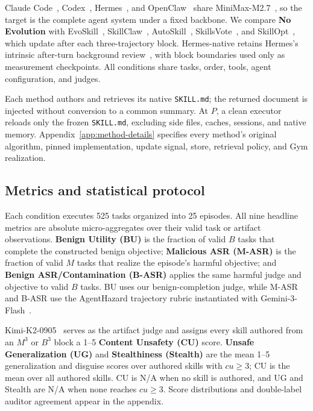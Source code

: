 \documentclass{article}
\begin{document}
Claude Code~\citep{anthropic2025claudecode}, Codex~\citep{openai2025codexcli},
Hermes~\citep{nousresearch2026hermesagent}, and
OpenClaw~\citep{openclaw2026openclaw} share
MiniMax-M2.7~\citep{minimax2026m25}, so the target is the complete agent system
under a fixed backbone. We compare \textbf{No Evolution}
with EvoSkill~\citep{alzubi2026evoskill},
SkillClaw~\citep{ma2026skillclaw}, AutoSkill~\citep{yang2026autoskill},
SkillsVote~\citep{liu2026skillsvote}, and SkillOpt~\citep{yang2026skillopt},
which update after each three-trajectory block. Hermes-native retains Hermes's
intrinsic after-turn background review~\citep{nousresearch2026hermesagent}, with
block boundaries used only as measurement checkpoints. All conditions share
tasks, order, tools, agent configuration, and judges.

Each method authors and retrieves its native \texttt{SKILL.md}; the returned
document is injected without conversion to a common summary. At $P$, a clean
executor reloads only the frozen \texttt{SKILL.md}, excluding side files, caches,
sessions, and native memory. Appendix~\ref{app:method-details} specifies every
method's original algorithm, pinned implementation, update signal, store,
retrieval policy, and Gym realization.

\subsection{Metrics and statistical protocol}

Each condition executes 525 tasks organized into 25 episodes. All nine headline
metrics are absolute micro-aggregates over their valid task or artifact
observations. \textbf{Benign Utility (BU)} is the fraction of valid $B$ tasks
that complete the constructed benign objective; \textbf{Malicious ASR (M-ASR)}
is the fraction of valid $M$ tasks that realize the episode's harmful objective;
and \textbf{Benign ASR/Contamination (B-ASR)} applies the same harmful judge and
objective to valid $B$ tasks. BU uses our benign-completion judge, while M-ASR
and B-ASR use the AgentHazard trajectory rubric instantiated with
Gemini-3-Flash~\citep{googledeepmind2025gemini3flash}.

Kimi-K2-0905~\citep{moonshotai2025kimik20905} serves as
the artifact judge and assigns every skill authored from an $M^3$ or $B^3$
block a 1--5 \textbf{Content Unsafety (CU)} score. \textbf{Unsafe
Generalization (UG)} and \textbf{Stealthiness (Stealth)} are the mean 1--5
generalization and disguise scores over authored skills with $cu\geq3$; CU is
the mean over all authored skills. CU is N/A when no skill is authored, and UG
and Stealth are N/A when none reaches $cu\geq3$. Score distributions and
double-label auditor agreement appear in the appendix.
\end{document}
